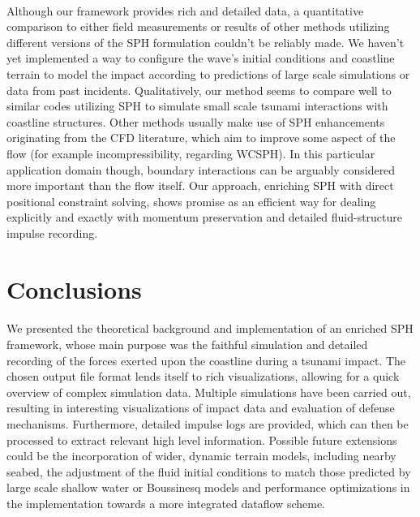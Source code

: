 \documentclass{llncs}
\begin{document}
\paragraph{} Although our framework provides rich and detailed data, a quantitative
comparison to either field measurements or results of other methods utilizing different
versions of the SPH formulation couldn't be reliably made. We haven't yet implemented a
way to configure the wave's initial conditions and coastline terrain to model the impact
according to predictions of large scale simulations or data from past
incidents. Qualitatively, our method seems to compare well to similar codes utilizing SPH
to simulate small scale tsunami interactions with coastline structures. Other methods
usually make use of SPH enhancements originating from the CFD literature, which aim to
improve some aspect of the flow (for example incompressibility, regarding WCSPH). In this
particular application domain though, boundary interactions can be arguably considered
more important than the flow itself. Our approach, enriching SPH with direct positional
constraint solving, shows promise as an efficient way for dealing explicitly and exactly
with momentum preservation and detailed fluid-structure impulse recording.

\section{Conclusions}

\paragraph{} We presented the theoretical background and implementation of an enriched SPH
framework, whose main purpose was the faithful simulation and detailed recording of the
forces exerted upon the coastline during a tsunami impact. The chosen output file format
lends itself to rich visualizations, allowing for a quick overview of complex simulation
data. Multiple simulations have been carried out, resulting in interesting visualizations
of impact data and evaluation of defense mechanisms. Furthermore, detailed impulse logs
are provided, which can then be processed to extract relevant high level
information. Possible future extensions could be the incorporation of wider, dynamic
terrain models, including nearby seabed, the adjustment of the fluid initial conditions to
match those predicted by large scale shallow water or Boussinesq models and performance
optimizations in the implementation towards a more integrated dataflow scheme.
\end{document}
